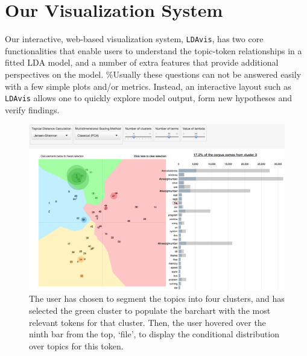 \documentclass[12pt,]{isuthesis}
\begin{document}
\section{Our Visualization System}\label{section:system}

Our interactive, web-based visualization system, \texttt{LDAvis}, has
two core functionalities that enable users to understand the topic-token
relationships in a fitted LDA model, and a number of extra features that
provide additional perspectives on the model. \%Usually these questions
can not be answered easily with a few simple plots and/or metrics.
Instead, an interactive layout such as \texttt{LDAvis} allows one to
quickly explore model output, form new hypotheses and verify findings.

\begin{figure}[htbp]
\centering
\includegraphics{images/fig_file_new2}
\caption{\label{fig:file}The user has chosen to segment the topics into four
clusters, and has selected the green cluster to populate the barchart
with the most relevant tokens for that cluster. Then, the user hovered
over the ninth bar from the top, `file', to display the conditional
distribution over topics for this token.}
\end{figure}
\end{document}
